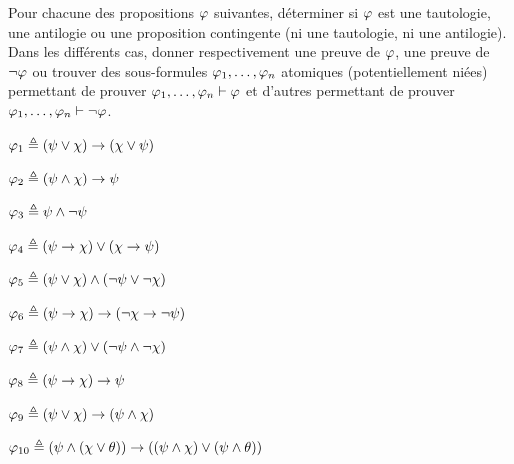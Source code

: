 \begin{exercise}
  Pour chacune des propositions $\varphi$ suivantes, déterminer si $\varphi$
  est une tautologie, une antilogie ou une proposition contingente (ni une
  tautologie, ni une antilogie). Dans les différents cas, donner respectivement
  une preuve de $\varphi$, une preuve de $\lnot\varphi$ ou trouver des
  sous-formules $\varphi_1,\ldots,\varphi_n$ atomiques (potentiellement niées)
  permettant de prouver $\varphi_1,\ldots,\varphi_n\vdash\varphi$ et d'autres
  permettant de prouver $\varphi_1,\ldots,\varphi_n\vdash\lnot\varphi$.

  \vspace{5pt}
  \begin{itemize}
    \begin{minipage}{0.45\textwidth}
    \item $\varphi_1 \triangleq (\psi\lor \chi)\to (\chi\lor \psi)$
    \item $\varphi_2 \triangleq (\psi\land \chi) \to \psi$
    \item $\varphi_3 \triangleq \psi\land\lnot\psi$
    \item $\varphi_4 \triangleq (\psi\to\chi)\lor(\chi\to\psi)$
    \item $\varphi_5 \triangleq (\psi\lor\chi)\land(\lnot\psi\lor\lnot\chi)$
    \end{minipage}
    \begin{minipage}{0.45\textwidth}
    \item $\varphi_6 \triangleq (\psi\to\chi)\to(\lnot\chi\to\lnot\psi)$
    \item
      $\varphi_7 \triangleq (\psi\land\chi)\lor(\lnot \psi\land\lnot\chi)$
    \item $\varphi_8 \triangleq (\psi\to\chi)\to\psi$
    \item $\varphi_9 \triangleq (\psi\lor \chi)\to(\psi\land\chi)$
    \item
      $\varphi_{10} \triangleq
      (\psi\land(\chi\lor\theta))\to
      ((\psi\land\chi)\lor(\psi\land\theta))$
    \end{minipage}
  \end{itemize}
\end{exercise}

